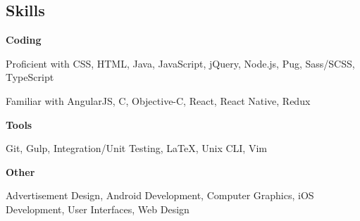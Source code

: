 \documentclass[9pt]{extarticle}
\newcommand{\Bullet}[1]{\item{\color{bullet}#1}}
\newcommand{\Bullets}[1]{\begin{trivlist}#1\end{trivlist}}
\newcommand{\Subtitle}[1]{{\color{subtitle}\normalsize\bfseries#1}}
\newcommand{\Subsection}[2]{\Subtitle{#1}\Bullets{#2}}
\begin{document}
\begin{paracol}{2}
\begin{rightcolumn}
        \section{Skills}
            \Subsection{Coding}{
                \Bullet{Proficient with CSS, HTML, Java, JavaScript, jQuery, Node.js, Pug, Sass/SCSS, TypeScript}
                \vfill
                \Bullet{Familiar with AngularJS, C, Objective-C, React, React Native, Redux}
            }
            \vfill
            \Subsection{Tools}{
                \Bullet{Git, Gulp, Integration/Unit Testing, LaTeX, Unix CLI, Vim}
            }
            \vfill
            \Subsection{Other}{
                \Bullet{Advertisement Design, Android Development, Computer Graphics, iOS Development, User Interfaces, Web Design}
            }
        \pagebreak
    \end{rightcolumn}
\end{paracol}
\end{document}
